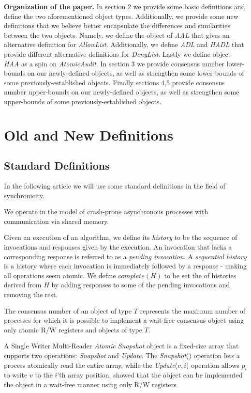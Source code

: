 \documentclass[11pt]{article}
\theoremstyle{definition}
\begin{document}
\textbf{Organization of the paper.} In section 2 we provide some basic definitions and define the two aforementioned object types. Additionally, we provide some new definitions that we believe better encapsulate the differences and similarities between the two objects. Namely, we define the object of \textit{AAL} that gives an alternative definition for \textit{AllowList}. Additionally, we define \textit{ADL} and \textit{HADL} that provide different alternative definitions for \textit{DenyList}. Lastly we define object \textit{HAA} as a spin on \textit{AtomicAudit}. In section 3 we provide consensus number lower-bounds on our newly-defined objects, as well as strengthen some lower-bounds of some previously-established objects. Finally sections 4,5 provide consensus number upper-bounds on our newly-defined objects, as well as strengthen some upper-bounds of some previously-established objects.

\section{Old  and New Definitions}
\subsection{Standard Definitions}
In the following article we will use some standard definitions in the field of synchronicity. 

We operate in the model of crash-prone asynchronous processes with communication via shared memory.

Given an execution of an algorithm, we define its \textit{history} to be the sequence of invocations and responses given by the execution. An invocation that lacks a corresponding response is referred to as a \textit{pending invocation}. A \textit{sequential history} is a history where each invocation is immediately followed by a response - making all operations seem atomic. We define $complete(H)$ to be set the of histories derived from $H$ by adding responses to some of the pending invocations and removing the rest.

The consensus number of an object of type $T$ represents the maximum number of processes for which it is possible to implement a wait-free consensus object using only atomic R/W registers and objects of type $T$.

A Single Writer Multi-Reader \textit{Atomic Snapshot} object \cite{afek1993atomic} is a fixed-size array that supports two operations: \textit{Snapshot} and \textit{Update}. The \textit{Snapshot}() operation lets a process atomically read the entire array, while the  \textit{Update}($v, i$) operation allows $p_i$ to write $v$ to the $i$'th array position. \cite{afek1993atomic} showed that the object can be implemented the object in a wait-free manner using only R/W registers.
\end{document}
